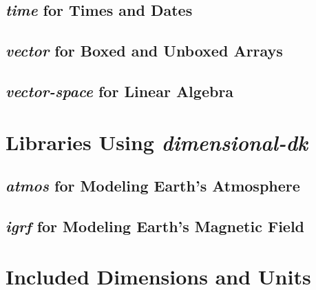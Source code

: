 \documentclass[12pt]{report}
\newcommand{\packagename}[1]{\textit{#1}}
\newcommand{\thispackage}{\packagename{dimensional-dk}}
\begin{document}
\section{\packagename{time} for Times and Dates}
\section{\packagename{vector} for Boxed and Unboxed Arrays}
\section{\packagename{vector-space} for Linear Algebra}

\chapter{Libraries Using \thispackage}

\section{\packagename{atmos} for Modeling Earth's Atmosphere}
\section{\packagename{igrf} for Modeling Earth's Magnetic Field}

\chapter{Included Dimensions and Units}
\end{document}
